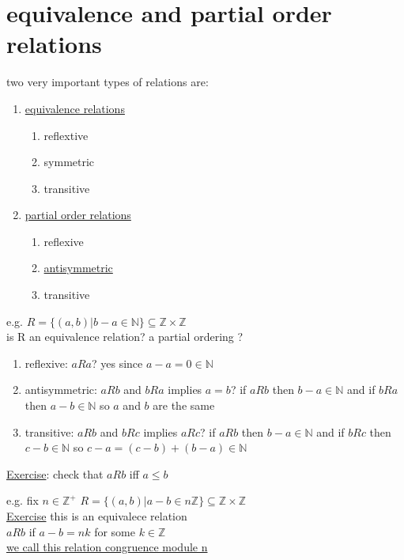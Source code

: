 \documentclass{article}
\begin{document}
 \section{equivalence and partial order relations}
 \begin{definition}
    two very important types of relations are: 
    \begin{enumerate}
        \item \underline{equivalence relations} 
            \begin{enumerate}
                \item reflextive
                \item symmetric
                \item transitive
            \end{enumerate}
        \item \underline{partial order relations}
            \begin{enumerate}
                \item reflexive
                \item \underline{antisymmetric}
                \item transitive
            \end{enumerate}
    \end{enumerate}
\end{definition}
    e.g. $R = \{(a,b) | b-a \in \mathbb{N}\} \subseteq \mathbb{Z} \times \mathbb{Z}$ 
    \\
    is R an equivalence relation? a partial ordering ? 
    \begin{enumerate}
        \item reflexive: $aRa$? yes since $a - a = 0 \in \mathbb{N}$
        \item antisymmetric: $aRb$ and $bRa$ implies $a=b$? if $aRb$ then $b-a \in \mathbb{N}$ and if $bRa$ then $a-b \in \mathbb{N}$ so $a$ and $b$ are the same
        \item transitive: $aRb$ and $bRc$ implies $aRc$? if $aRb$ then $b-a \in \mathbb{N}$ and if $bRc$ then $c-b \in \mathbb{N}$ so $c-a = (c-b) + (b-a) \in \mathbb{N}$
    \end{enumerate}
    \underline{Exercise}: check that $aRb$ iff $a \leq b$ 


    e.g. fix $n \in \mathbb{Z}^{+}$  $R = \{(a,b) | a -b \in n \mathbb{Z} \} \subseteq \mathbb{Z} \times \mathbb{Z} $ \\ 
    \underline{Exercise} this is an equivalece relation 
    \\ $aRb$ if $a- b = nk$ for some $k \in \mathbb{Z}$ \\ \underline{we call this relation congruence module n}
\end{document}
